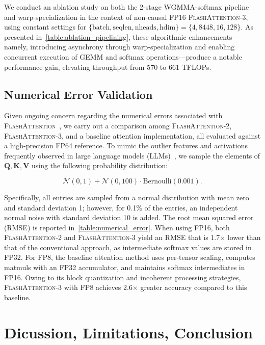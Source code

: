 \begin{enumerate}
\begin{algorithm}[H]
\begin{algorithmic}[1]
\begin{itemize}
We conduct an ablation study on both the 2-stage WGMMA-softmax pipeline and warp-specialization in the context of non-causal FP16 \textsc{FlashAttention-3}, using constant settings for $\{\text{batch}, \text{seqlen}, \text{nheads}, \text{hdim}\} = \{ 4, 8448, 16, 128\}$. As presented in~\cref{table:ablation_pipelining}, these algorithmic enhancements—namely, introducing asynchrony through warp-specialization and enabling concurrent execution of GEMM and softmax operations—produce a notable performance gain, elevating throughput from 570 to 661 TFLOPs.

\subsection{Numerical Error Validation}
\label{sec:numerical_error}

Given ongoing concern regarding the numerical errors associated with \textsc{FlashAttention}~\citep{golden2024flash}, we carry out a comparison among \textsc{FlashAttention-2}, \textsc{FlashAttention-3}, and a baseline attention implementation, all evaluated against a high-precision FP64 reference. To mimic the outlier features and activations frequently observed in large language models (LLMs)~\citep{dettmers2208llm, sun2024massive}, we sample the elements of $\mathbf{Q}, \mathbf{K}, \mathbf{V}$ using the following probability distribution:

\begin{equation*}
  \mathcal{N}(0, 1) + \mathcal{N}(0, 100) \cdot \mathrm{Bernoulli}(0.001).
\end{equation*}

Specifically, all entries are sampled from a normal distribution with mean zero and standard deviation 1; however, for 0.1\% of the entries, an independent normal noise with standard deviation 10 is added. The root mean squared error (RMSE) is reported in~\cref{table:numerical_error}. When using FP16, both \textsc{FlashAttention-2} and \textsc{FlashAttention-3} yield an RMSE that is 1.7$\times$ lower than that of the conventional approach, as intermediate softmax values are stored in FP32. For FP8, the baseline attention method uses per-tensor scaling, computes matmuls with an FP32 accumulator, and maintains softmax intermediates in FP16. Owing to its block quantization and incoherent processing strategies, \textsc{FlashAttention-3} with FP8 achieves 2.6$\times$ greater accuracy compared to this baseline.

\section{Dicussion, Limitations, Conclusion}
\label{sec:discussion}


\end{itemize}
\end{algorithmic}
\end{algorithm}
\end{enumerate}
